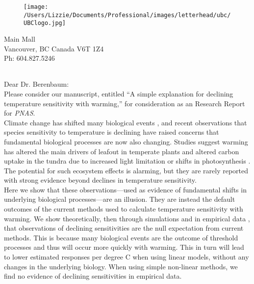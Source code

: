 \documentclass[11pt,a4paper]{article}
\begin{document}

\begin{figure}[htbp]
\hspace*{14cm}                                                           
\texttt{[image: /Users/Lizzie/Documents/Professional/images/letterhead/ubc/UBClogo.jpg]}
\end{figure}
\vspace{-10ex}
\begin{small}
 Main Mall \\
\noindent Vancouver, BC Canada V6T 1Z4\\
\noindent Ph: 604.827.5246\\
\end{small}
\vspace{2ex}\\
\noindent Dear Dr. Berenbaum:
\vspace{1.5ex}\\
Please consider our manuscript, entitled ``A simple explanation for declining temperature sensitivity with warming,'' for consideration as an Research Report for \emph{PNAS}. %
\vspace{1.5ex}\\
Climate change has shifted many biological events \citep{IPCC:2014sm}, and recent observations that species sensitivity to temperature is declining have raised concerns that fundamental biological processes are now also changing. Studies suggest warming has altered the main drivers of leafout in temperate plants \citep{fu2015,gusewell2017,Samplonius:2018aa,vitasse2018} and altered carbon uptake in the tundra due to increased light limitation or shifts in photosynthesis \citep{piao2017,Zhu2019}. The potential for such ecosystem effects is alarming, but they are rarely reported with strong evidence beyond declines in temperature sensitivity.
\vspace{1.5ex}\\
Here we show that these observations---used as evidence of fundamental shifts in underlying biological processes---are an illusion. They are instead the default outcomes of the current methods used to calculate temperature sensitivity with warming. We show theoretically, then through simulations and in empirical data \citep[using the same dataset used in][]{fu2015}, that observations of declining sensitivities are the null expectation from current methods. This is because many biological events are the outcome of threshold processes and thus will occur more quickly with warming. This in turn will lead to lower estimated responses per degree C when using linear models, without any changes in the underlying biology. When using simple non-linear methods, we find no evidence of declining sensitivities in empirical data. %
\end{document}
